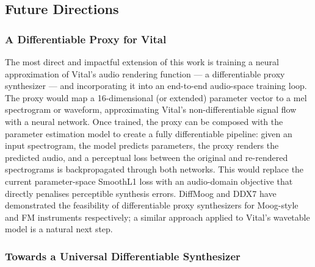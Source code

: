 \subsection{Future Directions}

\subsubsection{A Differentiable Proxy for Vital}

\noindent
The most direct and impactful extension of this work is training a neural approximation of Vital's audio rendering function — a differentiable proxy synthesizer — and incorporating it into an end-to-end audio-space training loop. The proxy would map a 16-dimensional (or extended) parameter vector to a mel spectrogram or waveform, approximating Vital's non-differentiable signal flow with a neural network. Once trained, the proxy can be composed with the parameter estimation model to create a fully differentiable pipeline: given an input spectrogram, the model predicts parameters, the proxy renders the predicted audio, and a perceptual loss between the original and re-rendered spectrograms is backpropagated through both networks. This would replace the current parameter-space SmoothL1 loss with an audio-domain objective that directly penalises perceptible synthesis errors. DiffMoog \cite{diffmoog} and DDX7 \cite{caspe2022ddx7} have demonstrated the feasibility of differentiable proxy synthesizers for Moog-style and FM instruments respectively; a similar approach applied to Vital's wavetable model is a natural next step.

\subsubsection{Towards a Universal Differentiable Synthesizer}

